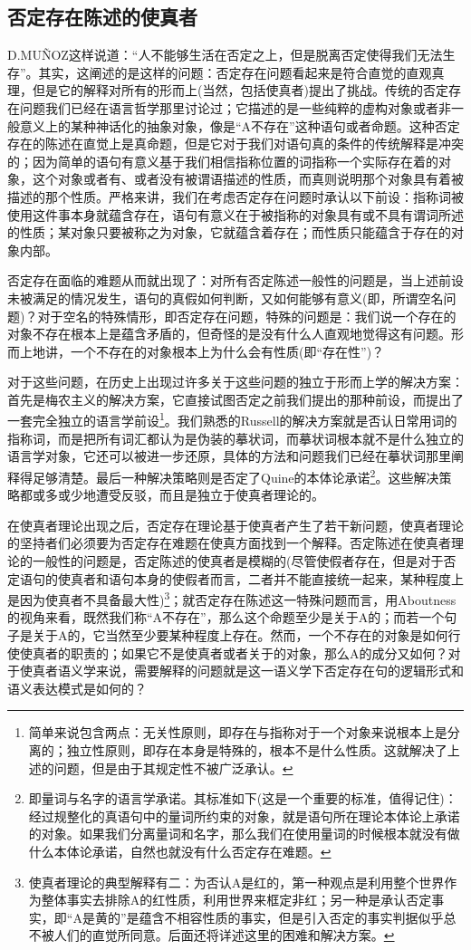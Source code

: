 \documentclass{article}
\begin{document}
\subsection{否定存在陈述的使真者}
D.MUÑOZ这样说道：“人不能够生活在否定之上，但是脱离否定使得我们无法生存”。其实，这阐述的是这样的问题：否定存在问题看起来是符合直觉的直观真理，但是它的解释对所有的形而上(当然，包括使真者)提出了挑战。传统的否定存在问题我们已经在语言哲学那里讨论过；它描述的是一些纯粹的虚构对象或者非一般意义上的某种神话化的抽象对象，像是“A不存在”这种语句或者命题。这种否定存在的陈述在直觉上是真命题，但是它对于我们对语句真的条件的传统解释是冲突的；因为简单的语句有意义基于我们相信指称位置的词指称一个实际存在着的对象，这个对象或者有、或者没有被谓语描述的性质，而真则说明那个对象具有着被描述的那个性质。严格来讲，我们在考虑否定存在问题时承认以下前设：指称词被使用这件事本身就蕴含存在，语句有意义在于被指称的对象具有或不具有谓词所述的性质；某对象只要被称之为对象，它就蕴含着存在；而性质只能蕴含于存在的对象内部。

否定存在面临的难题从而就出现了：对所有否定陈述一般性的问题是，当上述前设未被满足的情况发生，语句的真假如何判断，又如何能够有意义(即，所谓空名问题)？对于空名的特殊情形，即否定存在问题，特殊的问题是：我们说一个存在的对象不存在根本上是蕴含矛盾的，但奇怪的是没有什么人直观地觉得这有问题。形而上地讲，一个不存在的对象根本上为什么会有性质(即“存在性”)？

对于这些问题，在历史上出现过许多关于这些问题的独立于形而上学的解决方案：首先是梅农主义的解决方案，它直接试图否定之前我们提出的那种前设，而提出了一套完全独立的语言学前设\footnote{简单来说包含两点：无关性原则，即存在与指称对于一个对象来说根本上是分离的；独立性原则，即存在本身是特殊的，根本不是什么性质。这就解决了上述的问题，但是由于其规定性不被广泛承认。}。我们熟悉的Russell的解决方案就是否认日常用词的指称词，而是把所有词汇都认为是伪装的摹状词，而摹状词根本就不是什么独立的语言学对象，它还可以被进一步还原，具体的方法和问题我们已经在摹状词那里阐释得足够清楚。最后一种解决策略则是否定了Quine的本体论承诺\footnote{即量词与名字的语言学承诺。其标准如下(这是一个重要的标准，值得记住)：{\heiti 经过规整化的真语句中的量词所约束的对象，就是语句所在理论本体论上承诺的对象。}如果我们分离量词和名字，那么我们在使用量词的时候根本就没有做什么本体论承诺，自然也就没有什么否定存在难题。}。这些解决策略都或多或少地遭受反驳，而且是独立于使真者理论的。

在使真者理论出现之后，否定存在理论基于使真者产生了若干新问题，使真者理论的坚持者们必须要为否定存在难题在使真方面找到一个解释。否定陈述在使真者理论的一般性的问题是，否定陈述的使真者是模糊的(尽管使假者存在，但是对于否定语句的使真者和语句本身的使假者而言，二者并不能直接统一起来，某种程度上是因为使真者不具备最大性)\footnote{使真者理论的典型解释有二：为否认A是红的，第一种观点是利用整个世界作为整体事实去排除A的红性质，利用世界来框定非红；另一种是承认否定事实，即“A是黄的”是蕴含不相容性质的事实，但是引入否定的事实判据似乎总不被人们的直觉所同意。后面还将详述这里的困难和解决方案。}；就否定存在陈述这一特殊问题而言，用Aboutness的视角来看，既然我们称“A不存在”，那么这个命题至少是关于A的；而若一个句子是关于A的，它当然至少要某种程度上存在。然而，一个不存在的对象是如何行使使真者的职责的；如果它不是使真者或者关于的对象，那么A的成分又如何？对于使真者语义学来说，需要解释的问题就是这一语义学下否定存在句的逻辑形式和语义表达模式是如何的？
\end{document}
